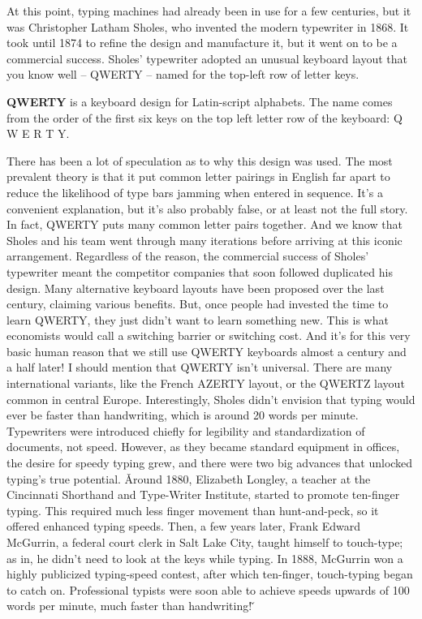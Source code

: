 At this point, typing machines had already been in use for a few centuries, but it was Christopher Latham Sholes, who
invented the modern typewriter in 1868. It took until 1874 to refine the design and manufacture it, but it went on to
be a commercial success. Sholes' typewriter adopted an unusual keyboard layout that you know well – QWERTY – named
for the top-left row of letter keys.

\bd[QWERTY]
\textbf{QWERTY} is a keyboard design for Latin-script alphabets. The name comes from the order of the first six keys
on the top left letter row of the keyboard: Q W E R T Y.
\ed

There has been a lot of speculation as to why this design was used. The most prevalent theory is that it put common
letter pairings in English far apart to reduce the likelihood of type bars jamming when entered in sequence. It's a
convenient explanation, but it's also probably false, or at least not the full story. In fact, QWERTY puts many
common letter pairs together. And we know that Sholes and his team went through many iterations before arriving at
this iconic arrangement. Regardless of the reason, the commercial success of Sholes' typewriter meant the competitor
companies that soon followed duplicated his design. Many alternative keyboard layouts have been proposed over the
last century, claiming various benefits. But, once people had invested the time to learn QWERTY, they just didn't
want to learn something new. This is what economists would call a switching barrier or switching cost. And it's for
this very basic human reason that we still use QWERTY keyboards almost a century and a half later! I should mention
that QWERTY isn't universal. There are many international variants, like the French AZERTY layout, or the QWERTZ
layout common in central Europe. Interestingly, Sholes didn't envision that typing would ever be faster than
handwriting, which is around 20 words per minute. Typewriters were introduced chiefly for legibility and
standardization of documents, not speed. However, as they became standard equipment in offices, the desire for speedy
typing grew, and there were two big advances that unlocked typing's true potential. \v

Around 1880, Elizabeth Longley, a teacher at the Cincinnati Shorthand and Type-Writer Institute, started to promote
ten-finger typing. This required much less finger movement than hunt-and-peck, so it offered enhanced typing speeds.
Then, a few years later, Frank Edward McGurrin, a federal court clerk in Salt Lake City, taught himself to
touch-type; as in, he didn't need to look at the keys while typing. In 1888, McGurrin won a highly publicized
typing-speed contest, after which ten-finger, touch-typing began to catch on. Professional typists were soon able to
achieve speeds upwards of 100 words per minute, much faster than handwriting! \v

